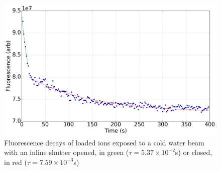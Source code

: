 \begin{figure}[H] \label{fig: shutter_closing}
	\centering
	\includegraphics[width=1\textwidth]{images/CBGB_sudden_shutter_flow.png}
	\caption{Fluorescence decays of loaded  ions exposed to a cold water beam with an inline shutter opened, in green ($\tau=5.37 \times 10^{-2}$s) or closed, in red ($\tau=7.59 \times 10^{-3}$s)}
\end{figure}
